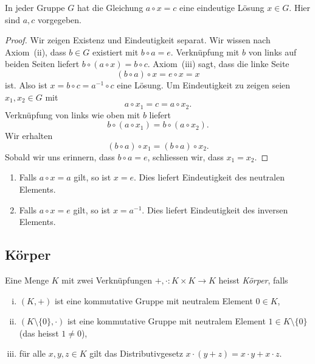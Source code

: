 \documentclass[../main.tex]{subfiles}
\begin{document}
\begin{proposition}
  In jeder Gruppe $G$
  hat die Gleichung $a \circ x = c$
  eine eindeutige Lösung $x \in G$. Hier sind $a,c$ vorgegeben.
\end{proposition}

\begin{proof}
  Wir zeigen Existenz und Eindeutigkeit separat. Wir wissen nach
  Axiom~(ii), dass $b \in G$ existiert mit $b \circ a = e$.
  Verknüpfung mit $b$ von links auf beiden Seiten liefert
  $b \circ (a \circ x) = b \circ c$. Axiom~(iii) sagt, dass
  die linke Seite
  \[
    (b \circ a) \circ x = e \circ x = x
  \]
  ist. Also ist $x = b \circ c = a^{-1} \circ c$ eine Lösung.
  Um Eindeutigkeit zu zeigen seien $x_{1}, x_{2} \in G$ mit
  \[
    a \circ x_{1} = c = a \circ x_{2}.
  \]
  Verknüpfung von links wie oben mit $b$ liefert
  \[b \circ (a \circ x_{1}) = b \circ (a \circ x_{2}).\]
  Wir erhalten
  \[
    (b \circ a) \circ x_{1} = (b \circ a) \circ x_{2}.
  \]
  Sobald wir uns erinnern, dass $b \circ a = e$, schliessen wir,
  dass $x_{1} = x_{2}$.
\end{proof}

\begin{specialcases}
  \leavevmode
  \begin{enumerate}[(1)]
    \item Falls $a \circ x = a$ gilt, so ist $x = e$. Dies liefert Eindeutigkeit
      des neutralen Elements.
    \item Falls $a \circ x = e$ gilt, so ist $x = a^{-1}$. Dies liefert
      Eindeutigkeit des inversen Elements.
  \end{enumerate}
\end{specialcases}

\subsection*{Körper}
\begin{definition}
  Eine Menge $K$ mit zwei Verknüpfungen $+, \cdot \colon K \times K \to K$ heisst
  \emph{Körper}, falls
  \begin{enumerate}[(i)]
    \item $(K, +)$ ist eine kommutative Gruppe mit neutralem
      Element $0 \in K$,
    \item $(K \setminus \{0\}, \cdot)$ ist eine kommutative Gruppe
      mit neutralem Element $1 \in K \setminus \{0\}$ (das heisst $1 \neq 0$),
    \item für alle $x,y,z \in K$ gilt das
      Distributivgesetz $x \cdot (y + z) = x \cdot y + x \cdot z$.
  \end{enumerate}
\end{definition}
\end{document}
